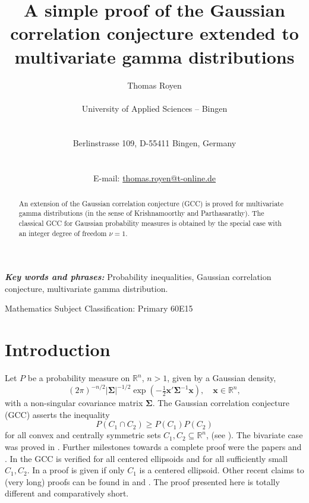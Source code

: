 \documentclass[12pt,twoside]{article}
\numberwithin{equation}{section}
\theoremstyle{plain}
\def\R{\mathbb{R}}
\def\bSigma{{\boldsymbol\Sigma}}
\def\bx{{\boldsymbol{x}}}
\begin{document}
\title{\bf\Large A simple proof of the Gaussian correlation conjecture extended to multivariate gamma distributions}

\author{{\large T{\sc homas} R{\sc oyen}} \medskip \\
\centerline{University of Applied Sciences -- Bingen} \\
\centerline{Berlinstrasse 109, D-55411 Bingen, Germany} \medskip \\
\centerline{E-mail: \href{mailto:thomas.royen@t-online.de}{thomas.royen@t-online.de}}
}

\date{}
\maketitle

\begin{abstract}
An extension of the Gaussian correlation conjecture (GCC) is proved for multivariate gamma distributions (in the sense of Krishnamoorthy and Parthasarathy). The classical GCC for Gaussian probability measures is obtained by the special case with an integer degree of freedom $\nu = 1$.
\end{abstract}

\smallskip
\noindent
{\it\bf Key words and phrases:}  Probability inequalities, Gaussian correlation conjecture, multivariate gamma distribution.

\smallskip
{} Mathematics Subject Classification: Primary 60E15



\section{Introduction}
\label{sec:introduction}

Let $P$ be a probability measure on $\R^n$, $n > 1$, given by a Gaussian density,
$$
(2\pi)^{-n/2} |\bSigma|^{-1/2} \exp(-\tfrac12 \bx'\bSigma^{-1} \bx), \quad \bx \in \R^n,
$$
with a non-singular covariance matrix $\bSigma$. The Gaussian correlation conjecture (GCC) asserts the inequality 
\begin{equation}
\label{1.1}
P(C_1 \cap C_2) \ge P(C_1) P(C_2)
\end{equation}
for all convex and centrally symmetric sets $C_1, C_2 \subseteq \R^n$, (see \cite{dasgupta}). The bivariate case was proved in \cite{pitt}. Further milestones towards a complete proof were the papers \cite{schechtman} and \cite{harge}. In \cite{schechtman} the GCC is verified for all centered ellipsoids and for all sufficiently small $C_1, C_2$. In \cite{harge} a proof is given if only $C_1$ is a centered ellipsoid. Other recent claims to (very long) proofs can be found in \cite{memarian} and \cite{qing}. The proof presented here is totally different and comparatively short. 
\end{document}
